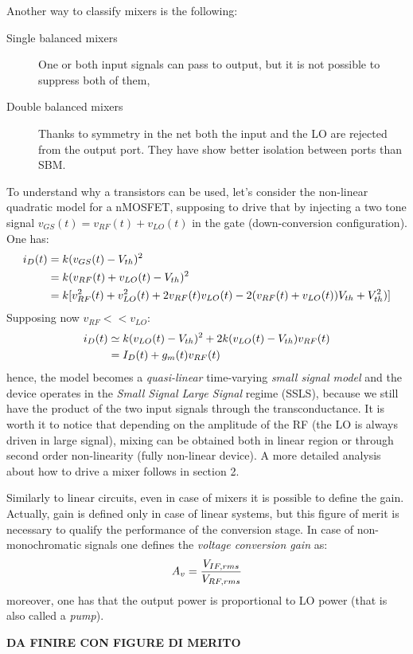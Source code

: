 Another way to classify mixers is the following:
\begin{description}
	\item [Single balanced mixers] One or both input signals can pass to output, but it is not possible to suppress both of them,
	\item [Double balanced mixers] Thanks to symmetry in the net both the input and the LO are rejected from the output port. They have show better isolation between ports than SBM. 
\end{description}
To understand why a transistors can be used, let's consider the non-linear quadratic model for a nMOSFET, supposing to drive that by injecting a two tone signal $v_{GS}(t)=v_{RF}(t)+v_{LO}(t)$ in the gate (down-conversion configuration). One has:
\begin{align}
i_D(t) &= k(v_{GS}(t)-V_{th})^2 \notag \\
& = k(v_{RF}(t)+v_{LO}(t)-V_{th})^2 \notag \\
& = k[v_{RF}^2(t)+v_{LO}^2(t)+2v_{RF}(t)v_{LO}(t)-2(v_{RF}(t)+v_{LO}(t))V_{th}+V_{th}^2)] \notag
\end{align}
Supposing now $v_{RF}<<v_{LO}$:
\begin{align}
i_D(t) &\simeq k(v_{LO}(t)-V_{th})^2+2k(v_{LO}(t)-V_{th})v_{RF}(t) \notag  \\
& = I_D(t)+g_m(t)v_{RF}(t) \notag
\end{align}
hence, the model becomes a \emph{quasi-linear} time-varying \emph{small signal model} and the device operates in the \emph{Small Signal Large Signal} regime (SSLS), because we still have the product of the two input signals through the transconductance. It is worth it to notice that depending on the amplitude of the RF (the LO is always driven in large signal), mixing can be obtained both in linear region or through second order non-linearity (fully non-linear device).
A more detailed analysis about how to drive a mixer follows in section 2.

Similarly to linear circuits, even in case of mixers it is possible to define the gain. Actually, gain is defined only in case of linear systems, but this figure of merit is necessary to qualify the performance of the conversion stage.
In case of non-monochromatic signals one defines the \emph{voltage conversion gain} as:
\begin{equation}
	A_v= \frac{V_{IF,rms}}{V_{RF,rms}} \notag
\end{equation}
moreover, one has that the output power is proportional to LO power (that is also called a \emph{pump}).

\textbf{DA FINIRE CON FIGURE DI MERITO}